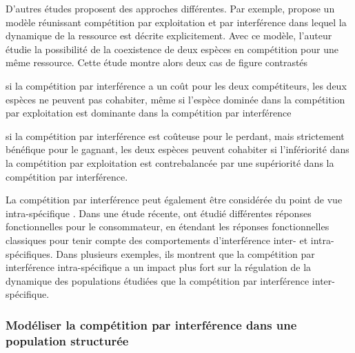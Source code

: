 D'autres études proposent des approches différentes. Par exemple,
\textcite{amarasekare2002a} propose un modèle réunissant compétition par
exploitation et par interférence dans lequel la dynamique de la ressource est
décrite explicitement. Avec ce modèle, l'auteur étudie la possibilité de la
coexistence de deux espèces en compétition pour une même ressource. Cette étude
montre alors deux cas de figure contrastés \begin{enumerate*}[label=(\roman*),
before=\unskip{ : }, itemjoin={{ ; }}, itemjoin*={{ ; et }}] \item si la
compétition par interférence a un coût pour les deux compétiteurs, les deux
espèces ne peuvent pas cohabiter, même si l'espèce dominée dans la compétition
par exploitation est dominante dans la compétition par interférence \item si la
compétition par interférence est coûteuse pour le perdant, mais strictement
bénéfique pour le gagnant, les deux espèces peuvent cohabiter si l'infériorité
dans la compétition par exploitation est contrebalancée par une supériorité dans
la compétition par interférence. \end{enumerate*}

La compétition par interférence peut également être considérée du point de vue
intra-spécifique \autocites{walde1984a, crowley1987a, maddonni2004a,
smallegange2006a}. Dans une étude récente, \textcite{de-villemereuil2011a} ont
étudié différentes réponses fonctionnelles pour le consommateur, en étendant les
réponses fonctionnelles classiques pour tenir compte des comportements
d'interférence inter- et intra-spécifiques. Dans plusieurs exemples, ils
montrent que la compétition par interférence intra-spécifique a un impact plus
fort sur la régulation de la dynamique des populations étudiées que la compétition par
interférence inter-spécifique. 

\subsubsection{Modéliser la compétition par interférence dans une population
structurée}

